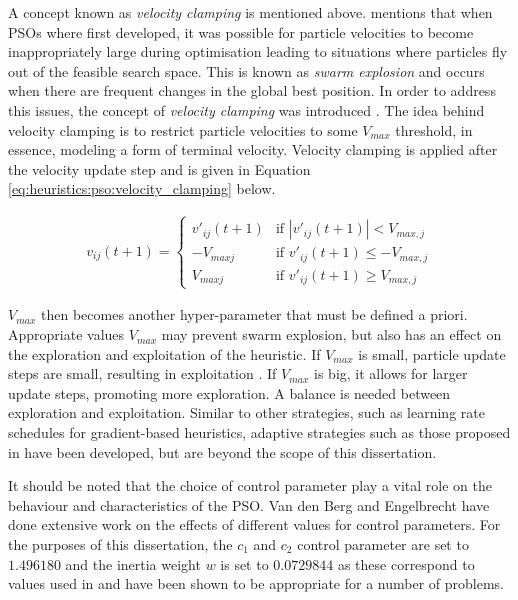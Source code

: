 A concept known as \textit{velocity clamping} is mentioned above. \citeauthor{ref:vanwyk:2014}\cite{ref:vanwyk:2014} mentions that when \acp{PSO} where first developed, it was possible for particle velocities to become inappropriately large during optimisation leading to situations where particles fly out of the feasible search space. This is known as \textit{swarm explosion} and occurs when there are frequent changes in the global best position. In order to address this issues, the concept of \textit{velocity clamping} was introduced \cite{ref:eberhart:1996}. The idea behind velocity clamping is to restrict particle velocities to some $V_{max}$ threshold, in essence, modeling a form of terminal velocity. Velocity clamping is applied after the velocity update step and is given in Equation \ref{eq:heuristics:pso:velocity_clamping} below.

\begin{equation}
    \label{eq:heuristics:pso:velocity_clamping}
    \begin{split}
        v_{ij}(t+1)= 
        \begin{cases}
            v'_{ij}(t+1) & \text{if } |v'_{ij}(t+1)| < V_{max,j} \\
            -V_{maxj}   & \text{if } v'_{ij}(t+1) \leq -V_{max,j}\\
            V_{maxj}   & \text{if } v'_{ij}(t+1) \geq V_{max,j}
        \end{cases}
    \end{split}
\end{equation}

$V_{max}$ then becomes another hyper-parameter that must be defined a priori. Appropriate values $V_{max}$ may prevent swarm explosion, but also has an effect on the exploration and exploitation of the heuristic. If $V_{max}$ is small, particle update steps are small, resulting in exploitation \cite{ref:eberhart:1996}. If $V_{max}$ is big, it allows for larger update steps, promoting more exploration. A balance is needed between exploration and exploitation. Similar to other strategies, such as learning rate schedules for gradient-based heuristics, adaptive strategies such as those proposed in \cite{ref:fan:2002} have been developed, but are beyond the scope of this dissertation.

It should be noted that the choice of control parameter play a vital role on the behaviour and characteristics of the \ac{PSO}. Van den Berg and Engelbrecht \cite{ref:vandenberg:2007}\cite{ref:vandenberg:2006} have done extensive work on the effects of different values for control parameters. For the purposes of this dissertation, the $c_{1}$ and $c_{2}$ control parameter are set to $1.496180$ and the inertia weight $w$ is set to $0.0729844$ as these correspond to values used in \cite{ref:eberhart:2000} and have been shown to be appropriate for a number of problems.

